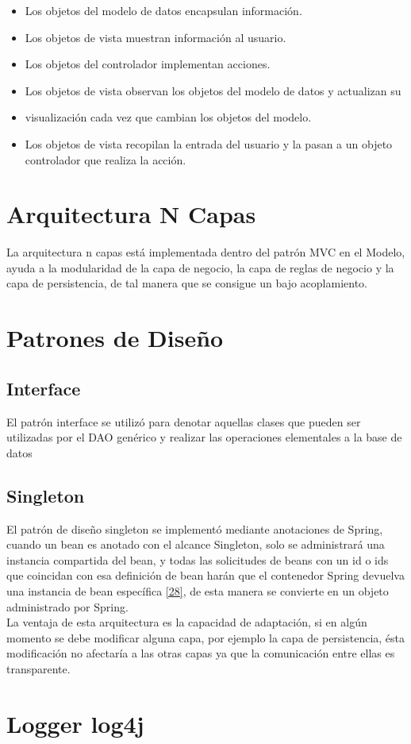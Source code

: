 \begin{itemize}
	\item Los objetos del modelo de datos encapsulan información.
	\item Los objetos de vista muestran información al usuario.
	\item Los objetos del controlador implementan acciones.
	\item Los objetos de vista observan los objetos del modelo de datos y actualizan su \item visualización cada vez que cambian los objetos del modelo.
	\item Los objetos de vista recopilan la entrada del usuario y la pasan a un objeto controlador que realiza la acción. 
\end{itemize}


\section{Arquitectura N Capas}
La arquitectura n capas está implementada dentro del patrón MVC en el Modelo, ayuda a la modularidad de la capa de negocio, la capa de reglas de negocio y la capa de persistencia, de tal manera que se consigue un bajo acoplamiento.


\section{Patrones de Diseño}
\subsection{Interface}
El patrón interface se utilizó para denotar aquellas clases que pueden ser utilizadas por el DAO genérico y realizar las operaciones elementales a la base de datos


\subsection{Singleton}
El patrón de diseño singleton se implementó mediante anotaciones de Spring, cuando un bean es anotado con el alcance Singleton, solo se administrará una instancia compartida del bean, y todas las solicitudes de beans con un id o ids que coincidan con esa definición de bean harán que el contenedor Spring devuelva una instancia de bean específica \hyperlink{b28}{[28]}, de esta manera se convierte en un objeto administrado por Spring.\\

La ventaja de esta arquitectura es la capacidad de adaptación, si en algún momento se debe modificar alguna capa, por ejemplo la capa de persistencia, ésta modificación no afectaría a las otras capas ya que la comunicación entre ellas es transparente.

\section{Logger log4j}



